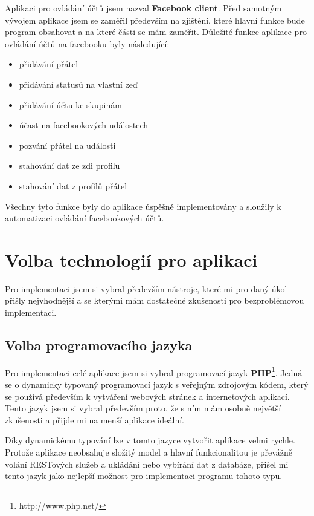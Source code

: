 \documentclass[thesis=M,czech]{FITthesis}[2013/05/10]
\begin{document}
Aplikaci pro ovládání účtů jsem nazval \textbf{Facebook client}. Před samotným vývojem aplikace jsem se zaměřil především na zjištění, které hlavní funkce bude program obsahovat a na které části se mám zaměřit. Důležité funkce aplikace pro ovládání účtů na facebooku byly následující:

\begin{itemize}
  \item přidávání přátel
  \item přidávání statusů na vlastní zeď
  \item přidávání účtu ke skupinám
  \item účast na facebookových událostech
  \item pozvání přátel na události
  \item stahování dat ze zdi profilu
  \item stahování dat z profilů přátel
\end{itemize}

Všechny tyto funkce byly do aplikace úspěšně implementovány a sloužily k automatizaci ovládání facebookových účtů.


\section{Volba technologií pro aplikaci}

Pro implementaci jsem si vybral především nástroje, které mi pro daný úkol přišly nejvhodnější a se kterými mám dostatečné zkušenosti pro bezproblémovou implementaci.

\subsection{Volba programovacího jazyka}

Pro implementaci celé aplikace jsem si vybral programovací jazyk \textbf{PHP}\footnote{http://www.php.net/}. Jedná se o dynamicky typovaný programovací jazyk s veřejným zdrojovým kódem, který se používá především k vytváření webových stránek a internetových aplikací. Tento jazyk jsem si vybral především proto, že s ním mám osobně největší zkušenosti a přijde mi na menší aplikace ideální. 

Díky dynamickému typování lze v tomto jazyce vytvořit aplikace velmi rychle. Protože aplikace neobsahuje složitý model a hlavní funkcionalitou je převážně volání RESTových služeb a ukládání nebo vybírání dat z databáze, přišel mi tento jazyk jako nejlepší možnost pro implementaci programu tohoto typu.
\end{document}
